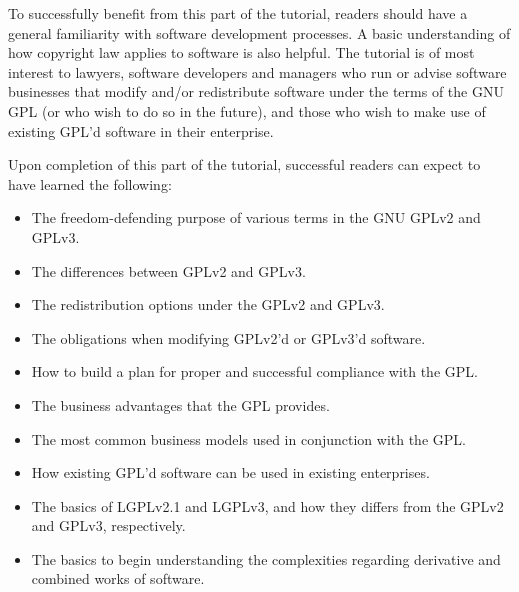 To successfully benefit from this part of the tutorial, readers should
have a general familiarity with software development processes.  A basic
understanding of how copyright law applies to software is also helpful.  The
tutorial is of most interest to lawyers, software developers and managers who
run or advise software businesses that modify and/or redistribute software
under the terms of the GNU GPL (or who wish to do so in the future), and those
who wish to make use of existing GPL'd software in their enterprise.

Upon completion of this part of the tutorial, successful readers can expect
to have learned the following:

\begin{itemize}

  \item The freedom-defending purpose of various terms in the GNU GPLv2 and GPLv3.

  \item The differences between GPLv2 and GPLv3.

  \item The redistribution options under the GPLv2 and GPLv3.

  \item The obligations when modifying GPLv2'd or GPLv3'd software.

  \item How to build a plan for proper and successful compliance with the GPL.

  \item The business advantages that the GPL provides.

  \item The most common business models used in conjunction with the GPL.

  \item How existing GPL'd software can be used in existing enterprises.

  \item The basics of LGPLv2.1 and LGPLv3, and how they
    differs from the GPLv2 and GPLv3, respectively.

  \item The basics to begin understanding the complexities regarding
    derivative and combined works of software.
\end{itemize}


